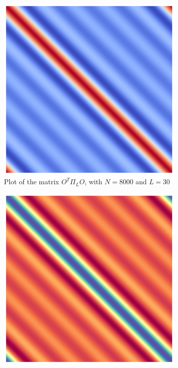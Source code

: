 \begin{figure}[H]
    \begin{subfigure}[b]{0.48\textwidth}
    \centering
  \includegraphics[width=\textwidth]{Figures/Matrix.png}  
  \caption{Plot of the matrix $O^{T}\Pi_L O$, with $N=8000$ and $L=30$}
  \label{Matriz_dirichlet}
    \end{subfigure}
  \hfill 
\begin{subfigure}[b]{0.48\textwidth}
        \centering
        \includegraphics[width=\textwidth]{Figures/Matrix_approx.png}

\end{subfigure}
\end{figure}
